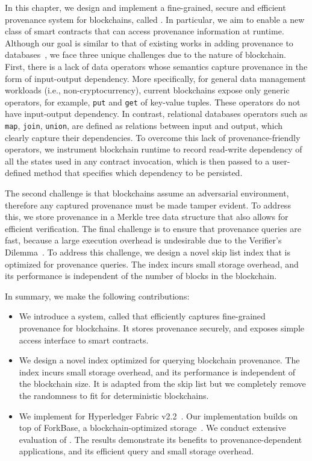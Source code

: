 In this chapter, we design and implement a fine-grained, secure and efficient provenance system for blockchains,
called {\fs}. In particular, we aim to enable a new class of smart contracts that can access provenance
information at runtime. Although our goal is similar to that of existing works in adding provenance to
databases~\cite{akoush2013hadoopprov,tian2016agri,psallidas2018smoke}, we face three unique challenges due to
the nature of blockchain. First, there is a lack of data operators whose semantics capture
provenance in the form of input-output dependency. More specifically, for general data management workloads (i.e.,
non-cryptocurrency), current blockchains expose only generic operators, for example, \texttt{put} and \texttt{get}
of key-value tuples. These operators do not have input-output dependency. In contrast, relational databases
operators such as \texttt{map}, \texttt{join}, \texttt{union}, are defined as relations between input and output, which
clearly capture their dependencies. To overcome this lack of provenance-friendly operators, we instrument
blockchain runtime to record read-write dependency of all the states used in any contract invocation, which is
then passed to a user-defined method that specifies which dependency to be persisted. 

The second challenge is that blockchains assume an adversarial environment, therefore any captured provenance
must be made tamper evident. To address this, we store provenance in a Merkle tree data structure
that also allows for efficient verification. The final challenge is to ensure that provenance queries are
fast, because a large execution overhead is undesirable due to the Verifier's
Dilemma~\cite{luu2015demystifying}. To address this challenge, we design a novel skip list index that is optimized
for provenance queries. The index incurs small storage overhead, and its performance is independent of the number of blocks in the blockchain. 

In summary, we make the following contributions: 
\begin{itemize}
  \item We introduce a system, called {\fs} that efficiently captures fine-grained provenance for
  blockchains. It stores provenance securely, and exposes simple access interface to smart contracts. 

  \item We design a novel index optimized for querying blockchain provenance. The index incurs small
  storage overhead, and its performance is independent of the blockchain size. 
  It is adapted from the skip list but we completely remove the randomness to fit for deterministic blockchains. 

  \item We implement {\fs} for Hyperledger Fabric v2.2~\cite{github:fabric}. Our implementation builds on top of
  ForkBase, a blockchain-optimized storage~\cite{wang2018forkbase}. We conduct extensive
  evaluation of {\fs}. The results demonstrate its benefits to provenance-dependent applications, and
  its efficient query and small storage overhead. 
\end{itemize}

